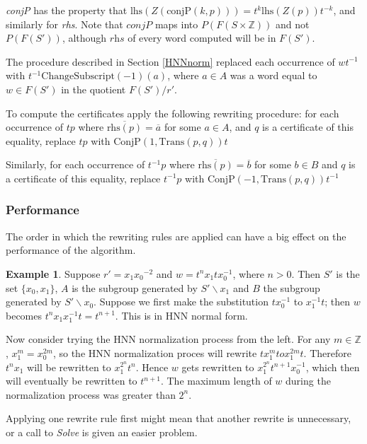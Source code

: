 \documentclass[11pt]{article} %
\theoremstyle{definition}
\theoremstyle{definition}
\theoremstyle{definition}
\theoremstyle{definition}
\theoremstyle{definition}
\theoremstyle{definition}
\newtheorem{exmpl}{Example}[theorem]
\begin{document}
\textit{conjP} has the property that
$\text{lhs}(Z(\text{conjP}(k, p))) = t^k \text{lhs}(Z(p))t^{-k}$,
and similarly for \textit{rhs}. Note that $\textit{conjP}$ maps into $P(F(S \times \mathbb{Z}))$
and not $P(F(S'))$, although $\textit{rhs}$ of every word computed
will be in $F(S')$.

The procedure described in Section \ref{HNNnorm}
replaced each occurrence of $wt^{-1}$ with \newline $t^{-1}\text{ChangeSubscript}(-1)(a)$,
where $a \in A$ was a word equal to $w \in F(S')$ in the quotient $F(S') / r'$.

To compute the certificates apply the following rewriting procedure:
for each occurrence of $tp$ where $\overline{\text{rhs}(p)} = \overline{a}$ for
some $a \in A$, and $q$ is a certificate of this equality,
replace $tp$ with $\text{ConjP}(1, \text{Trans}(p, q))t$

Similarly, for each occurrence of $t^{-1}p$ where $\overline{\text{rhs}(p)} = \overline{b}$ for
some $b \in B$ and $q$ is a certificate of this equality,
replace $t^{-1}p$ with $\text{ConjP}(-1, \text{Trans}(p, q))t^{-1}$

\subsubsection{Performance}

The order in which the rewriting rules are applied can have a big effect on the performance
of the algorithm.

\begin{exmpl}\label{ltrbad}
Suppose $r' = {x_1}{x_0}^{-2}$ and
$w = t^n x_1 t x_0^{-1}$, where $n > 0$.
Then $S'$ is the set $\{x_0, x_1\}$,
$A$ is the subgroup generated by $S' \backslash x_1$ and
$B$ the subgroup generated by $S' \backslash x_0$.
Suppose we first make the substitution $tx_0^{-1}$ to $x_1^{-1} t$;
then $w$ becomes $t^{n}x_1x_1^{-1}t = t^{n+1}$.
This is in HNN normal form.

Now consider trying the HNN normalization process from the left.
For any $m \in \mathbb{Z}$, $x_1^m = x_0^{2m}$,
so the HNN normalization proces will rewrite $tx_1^m to x_1^{2m}t$.
Therefore $t^nx_1$ will be rewritten to $x_1^{2^n}t^n$.
Hence $w$ gets rewritten to $x_1^{2^n} t^{n+1} x_0^{-1}$,
which then will eventually be rewritten to $t^{n+1}$. The maximum length
of $w$ during the normalization process was greater than $2^n$.
\end{exmpl}

Applying one rewrite rule first
might mean that another rewrite is unnecessary, or a call to \textit{Solve} is
given an easier problem.
\end{document}
